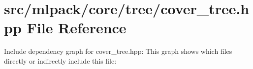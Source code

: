 \section{src/mlpack/core/tree/cover\-\_\-tree.hpp File Reference}
\label{cover__tree_8hpp}
Include dependency graph for cover\-\_\-tree.\-hpp\-:
This graph shows which files directly or indirectly include this file\-:
